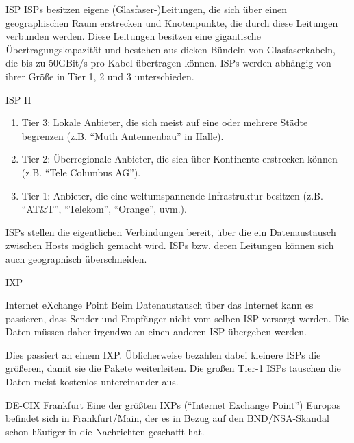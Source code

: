 \documentclass[hyperref={colorlinks,linkcolor=white}, utf8]{beamer}
\begin{document}
	\begin{frame}{ISP}
		ISPs besitzen eigene (Glasfaser-)Leitungen, die sich über einen geographischen Raum erstrecken und Knotenpunkte, die durch diese Leitungen verbunden werden. Diese Leitungen besitzen eine gigantische Übertragungskapazität und bestehen aus dicken Bündeln von Glasfaserkabeln, die bis zu 50GBit/s pro Kabel übertragen können.
		ISPs werden abhängig von ihrer Größe in Tier 1, 2 und 3 unterschieden.
	\end{frame}

	\begin{frame}{ISP II}
		\begin{enumerate}
			\item{Tier 3: Lokale Anbieter, die sich meist auf eine oder mehrere Städte begrenzen (z.B. \enquote{Muth Antennenbau} in Halle).}
			\item{Tier 2: Überregionale Anbieter, die sich über Kontinente erstrecken können (z.B. \enquote{Tele Columbus AG}).} 
			\item{Tier 1: Anbieter, die eine weltumspannende Infrastruktur besitzen (z.B. \enquote{AT\&T}, \enquote{Telekom}, \enquote{Orange}, uvm.).}
		\end{enumerate}
		
		ISPs stellen die eigentlichen Verbindungen bereit, über die ein Datenaustausch zwischen Hosts möglich gemacht wird. ISPs bzw. deren Leitungen können sich auch geographisch überschneiden.
	\end{frame}
	
	\begin{frame}{IXP}
		\begin{block}{Internet eXchange Point}
			Beim Datenaustausch über das Internet kann es passieren, dass Sender und Empfänger nicht vom selben ISP versorgt werden. Die Daten müssen daher irgendwo an einen anderen ISP übergeben werden. 
			
			Dies passiert an einem IXP. Üblicherweise bezahlen dabei kleinere ISPs die größeren, damit sie die Pakete weiterleiten. Die großen Tier-1 ISPs tauschen die Daten meist kostenlos untereinander aus.
		\end{block}
		
		\begin{exampleblock}{DE-CIX Frankfurt}
			Eine der größten IXPs (\enquote{Internet Exchange Point}) Europas befindet sich in Frankfurt/Main, der es in Bezug auf den BND/NSA-Skandal schon häufiger in die Nachrichten geschafft hat.
		\end{exampleblock}
	\end{frame}
	
\end{document}
